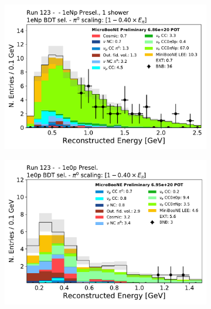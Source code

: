 \begin{figure}[ht] 
\begin{center}
    \begin{subfigure}[b]{0.3\textwidth}
    \centering
    \includegraphics[width=1.00\textwidth]{Sidebands/Figures/1eNp/HighEnergy/reco_e.pdf}
    \caption{\label{fig:intro:nueselections:1eNp}\npsel}
    \end{subfigure}
    \begin{subfigure}[b]{0.3\textwidth}
    \centering
    \includegraphics[width=1.00\textwidth]{introduction/reco_e_1e0p_08052020.pdf}
    \caption{\label{fig:intro:nueselections:1e0p}\zpsel}
    \end{subfigure}
    \begin{subfigure}[b]{0.28\textwidth}
    \centering

\end{subfigure}
\end{center}
\end{figure}
